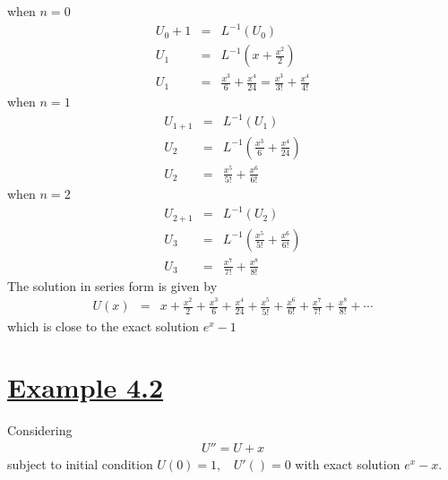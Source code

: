 \documentclass[11pt]{report}
\newcommand{\ubt}[1]{\textbf{\underline{#1}}}
\newcommand{\sps}{\\[0.2cm]}
\newcommand{\sprime}{'}
\newcommand{\dprime}{''}
\newcommand{\example}[1]{\section*{\ubt{Example #1}}}
\begin{document}
	when $n=0$
	\begin{eqnarray*}
		U_0+1&=& L^{-1}(U_0)\sps
		U_1 &=& L^{-1}\left(x + \frac{x^2}{2}\right)\sps
		U_1 &=& \frac{x^3}{6} + \frac{x^4}{24} = \frac{x^3}{3!} + \frac{x^4}{4!}
	\end{eqnarray*}
	when $n=1$
	\begin{eqnarray*}
		U_{1+1} &=& L^{-1}(U_1)\sps
		U_2 &=& L^{-1}\left(\frac{x^3}{6} + \frac{x^4}{24}\right)\sps
		U_2 &=& \frac{x^5}{5!} + \frac{x^6}{6!}
	\end{eqnarray*}
	when $n=2$
	\begin{eqnarray*}
		U_{2+1} &=& L^{-1}(U_2)\sps
		U_3 &=& L^{-1}\left(\frac{x^5}{5!} + \frac{x^6}{6!}\right)\sps
		U_3 &=&\frac{x^7}{7!} + \frac{x^8}{8!}
	\end{eqnarray*}
	The solution in series form is given by 
	\begin{eqnarray*}
		U(x)&=& x + \frac{x^2}{2}+\frac{x^3}{6} + \frac{x^4}{24} + \frac{x^5}{5!} + \frac{x^6}{6!} + \frac{x^7}{7!} + \frac{x^8}{8!}+ \cdots
	\end{eqnarray*}
	which is close to the exact solution $e^x - 1$
	\newpage
	\example{4.2}
	Considering 
	\begin{eqnarray}
		U\dprime = U + x \label{eq:4_9}
	\end{eqnarray}
	subject to initial condition $U(0) =1,~~~~ U\sprime()=0$ with exact solution $e^x - x$.
	
\end{document}
